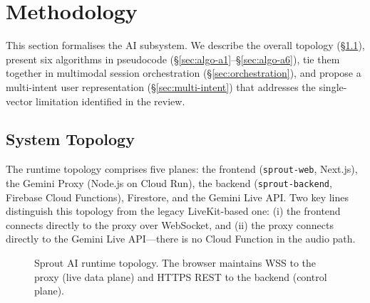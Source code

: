 \chapter{Methodology}
\label{ch:methodology}

This section formalises the AI subsystem. We describe the overall topology (\S\ref{sec:topology}), present six algorithms in pseudocode (\S\ref{sec:algo-a1}--\S\ref{sec:algo-a6}), tie them together in multimodal session orchestration (\S\ref{sec:orchestration}), and propose a multi-intent user representation (\S\ref{sec:multi-intent}) that addresses the single-vector limitation identified in the review.

\section{System Topology}
\label{sec:topology}

The runtime topology comprises five planes: the frontend (\texttt{sprout-web}, Next.js), the Gemini Proxy (Node.js on Cloud Run), the backend (\texttt{sprout-backend}, Firebase Cloud Functions), Firestore, and the Gemini Live API. Two key lines distinguish this topology from the legacy LiveKit-based one: (i) the frontend connects directly to the proxy over WebSocket, and (ii) the proxy connects directly to the Gemini Live API---there is no Cloud Function in the audio path.

\begin{figure}[H]
\centering
{}
\caption{Sprout AI runtime topology. The browser maintains WSS to the proxy (live data plane) and HTTPS REST to the backend (control plane).}
\label{fig:topology}
\end{figure}

